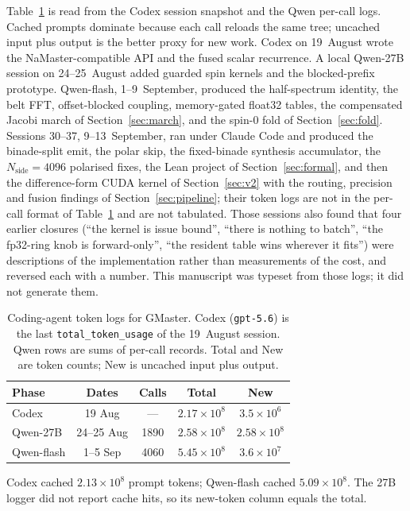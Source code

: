\documentclass[usenatbib,useAMS]{mnras}
\begin{document}
Table~\ref{tab:tokens} is read from the Codex session snapshot and the Qwen per-call logs. Cached prompts dominate because each call reloads the same tree; uncached input plus output is the better proxy for new work. Codex on 19~August wrote the NaMaster-compatible API and the fused scalar recurrence. A local Qwen-27B session on 24--25~August added guarded spin kernels and the blocked-prefix prototype. Qwen-flash, 1--9~September, produced the half-spectrum identity, the belt FFT, offset-blocked coupling, memory-gated float32 tables, the compensated Jacobi march of Section~\ref{sec:march}, and the spin-$0$ fold of Section~\ref{sec:fold}. Sessions 30--37, 9--13~September, ran under Claude Code and produced the binade-split emit, the polar skip, the fixed-binade synthesis accumulator, the $N_{\mathrm{side}}=4096$ polarised fixes, the Lean project of Section~\ref{sec:formal}, and then the difference-form CUDA kernel of Section~\ref{sec:v2} with the routing, precision and fusion findings of Section~\ref{sec:pipeline}; their token logs are not in the per-call format of Table~\ref{tab:tokens} and are not tabulated. Those sessions also found that four earlier closures (``the kernel is issue bound'', ``there is nothing to batch'', ``the fp32-ring knob is forward-only'', ``the resident table wins wherever it fits'') were descriptions of the implementation rather than measurements of the cost, and reversed each with a number. This manuscript was typeset from those logs; it did not generate them.

\begin{table}
\centering
\caption{Coding-agent token logs for GMaster. Codex (\texttt{gpt-5.6}) is the last \texttt{total\_token\_usage} of the 19~August session. Qwen rows are sums of per-call records. Total and New are token counts; New is uncached input plus output.}
\label{tab:tokens}
\small
\begin{tabular}{@{}lcccc@{}}
\toprule
Phase & Dates & Calls & Total & New \\
\midrule
Codex & 19 Aug & --- & $2.17\times10^8$ & $3.5\times10^6$ \\
Qwen-27B & 24--25 Aug & 1890 & $2.58\times10^8$ & $2.58\times10^8$ \\
Qwen-flash & 1--5 Sep & 4060 & $5.45\times10^8$ & $3.6\times10^7$ \\
\bottomrule
\end{tabular}

\vspace{2pt}
{\raggedright\small Codex cached $2.13\times10^8$ prompt tokens; Qwen-flash cached $5.09\times10^8$. The 27B logger did not report cache hits, so its new-token column equals the total.\par}
\end{table}
\end{document}
